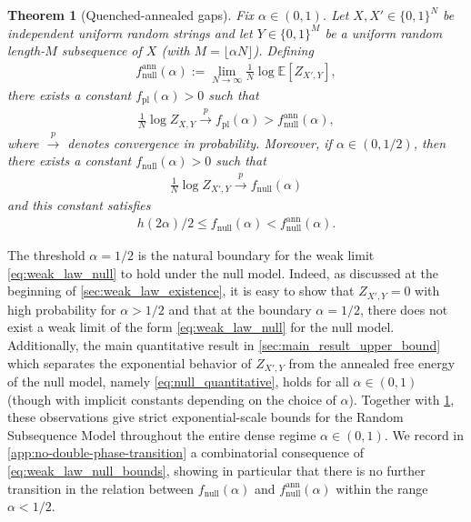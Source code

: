 \documentclass[11pt]{amsart}
\numberwithin{equation}{section}
\numberwithin{equation}{section}
\newcommand{\1}{\mathbbm{1}}
\newcommand{\E}{\mathbb{E}}
\newcommand{\fpl}{f_{\mathrm{pl}}}
\newcommand{\fnull}{f_{\mathrm{null}}}
\newcommand{\fnullann}{f_{\mathrm{null}}^{\mathrm{ann}}}
\newtheorem{theorem}{Theorem}[section]
\theoremstyle{definition}
\begin{document}
\begin{theorem}[Quenched-annealed gaps] \label{thm:weak_law}
    Fix $\alpha \in (0, 1)$. Let $X, X' \in \{0,1\}^N$ be independent uniform random strings and let $Y \in \{0,1\}^M$ be a uniform random length-$M$ subsequence of $X$ (with $M = \lfloor \alpha N \rfloor$). Defining
    \begin{align*}
        \fnullann(\alpha) := \lim_{N\to\infty} \frac{1}{N}\log \E\left[Z_{X',Y}\right],
    \end{align*}
    there exists a constant $\fpl(\alpha) > 0$ such that
    \begin{align} \label{eq:weak_law_planted_bounds}
        \frac{1}{N} \log Z_{X,Y} \xrightarrow{p} \fpl(\alpha) > \fnullann(\alpha),
    \end{align}
    where $\xrightarrow{p}$ denotes convergence in probability.
    Moreover, if $\alpha \in (0, 1/2)$, then there exists a constant $\fnull(\alpha) > 0$ such that
    \begin{align} \label{eq:weak_law_null}
        \frac{1}{N} \log Z_{X',Y} \xrightarrow{p} \fnull(\alpha)
    \end{align}
    and this constant satisfies
    \begin{align} \label{eq:weak_law_null_bounds}
        h( 2\alpha )/2 \leq \fnull(\alpha) < \fnullann(\alpha).
    \end{align}
\end{theorem}

The threshold $\alpha=1/2$ is the natural boundary for the weak limit \eqref{eq:weak_law_null} to hold under the null model. Indeed, as discussed at the beginning of \cref{sec:weak_law_existence}, it is easy to show that $Z_{X',Y} = 0$ with high probability for $\alpha > 1/2$ and that at the boundary $\alpha = 1/2$, there does not exist a weak limit of the form \eqref{eq:weak_law_null} for the null model. Additionally, the main quantitative result in \cref{sec:main_result_upper_bound} which separates the exponential behavior of $Z_{X',Y}$ from the annealed free energy of the null model, namely \eqref{eq:null_quantitative}, holds for all $\alpha \in (0,1)$ (though with implicit constants depending on the choice of $\alpha$). Together with \cref{thm:weak_law}, these observations give strict exponential-scale bounds for the Random Subsequence Model throughout the entire dense regime $\alpha \in (0,1)$. We record in \cref{app:no-double-phase-transition} a combinatorial consequence of \eqref{eq:weak_law_null_bounds}, showing in particular that there is no further transition in the relation between $\fnull(\alpha)$ and $\fnullann(\alpha)$ within the range $\alpha < 1/2$.
\end{document}
